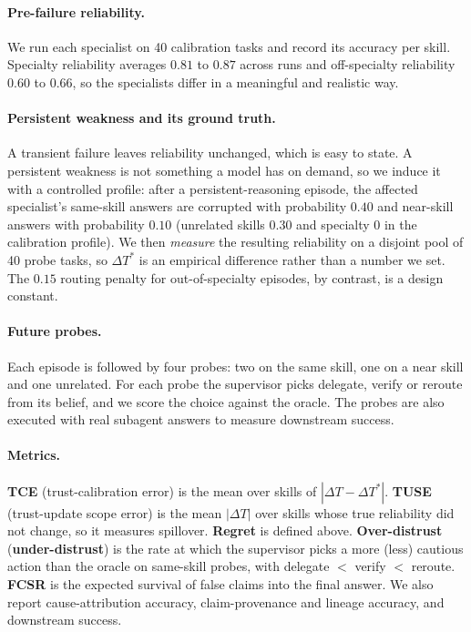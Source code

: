 \documentclass[letterpaper]{article}
\newcommand{\dT}{\Delta T}
\newcommand{\dTs}{\Delta T^{*}}
\begin{document}
\paragraph{Pre-failure reliability.}
We run each specialist on 40 calibration tasks and record its accuracy per skill. Specialty reliability averages $0.81$ to $0.87$ across runs and off-specialty reliability $0.60$ to $0.66$, so the specialists differ in a meaningful and realistic way.

\paragraph{Persistent weakness and its ground truth.}
A transient failure leaves reliability unchanged, which is easy to state. A persistent weakness is not something a model has on demand, so we induce it with a controlled profile: after a persistent-reasoning episode, the affected specialist's same-skill answers are corrupted with probability $0.40$ and near-skill answers with probability $0.10$ (unrelated skills $0.30$ and specialty $0$ in the calibration profile). We then \emph{measure} the resulting reliability on a disjoint pool of 40 probe tasks, so $\dTs$ is an empirical difference rather than a number we set. The $0.15$ routing penalty for out-of-specialty episodes, by contrast, is a design constant.

\paragraph{Future probes.}
Each episode is followed by four probes: two on the same skill, one on a near skill and one unrelated. For each probe the supervisor picks delegate, verify or reroute from its belief, and we score the choice against the oracle. The probes are also executed with real subagent answers to measure downstream success.

\paragraph{Metrics.}
\textbf{TCE} (trust-calibration error) is the mean over skills of $|\dT-\dTs|$. \textbf{TUSE} (trust-update scope error) is the mean $|\dT|$ over skills whose true reliability did not change, so it measures spillover. \textbf{Regret} is defined above. \textbf{Over-distrust} (\textbf{under-distrust}) is the rate at which the supervisor picks a more (less) cautious action than the oracle on same-skill probes, with delegate $<$ verify $<$ reroute. \textbf{FCSR} is the expected survival of false claims into the final answer. We also report cause-attribution accuracy, claim-provenance and lineage accuracy, and downstream success.
\end{document}
